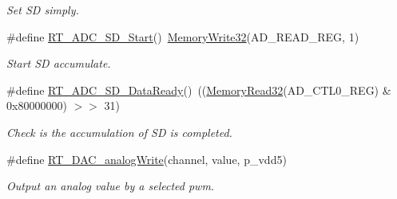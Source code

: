 \begin{DoxyCompactItemize}
\begin{DoxyCompactList}\small\item\em Set SD simply. \end{DoxyCompactList}\item 
\#define \mbox{\hyperlink{a00002_a201094f8f020811fe7d1cb26efe47094}{R\+T\+\_\+\+A\+D\+C\+\_\+\+S\+D\+\_\+\+Start}}()~\mbox{\hyperlink{a00020_a6b9732365b12e48ddb89fe1028b975b0}{Memory\+Write32}}(A\+D\+\_\+\+R\+E\+A\+D\+\_\+\+R\+EG, 1)
\begin{DoxyCompactList}\small\item\em Start SD accumulate. \end{DoxyCompactList}\item 
\#define \mbox{\hyperlink{a00002_aa3fc5e0f9802d24cd8c0090c86bf9299}{R\+T\+\_\+\+A\+D\+C\+\_\+\+S\+D\+\_\+\+Data\+Ready}}()~((\mbox{\hyperlink{a00020_a2d484dc15bdf30ee11ab3b05f31f0e16}{Memory\+Read32}}(A\+D\+\_\+\+C\+T\+L0\+\_\+\+R\+EG) \& 0x80000000) $>$$>$ 31)
\begin{DoxyCompactList}\small\item\em Check is the accumulation of SD is completed. \end{DoxyCompactList}\item 
\#define \mbox{\hyperlink{a00002_ab44c37130776b81ef554d8967fcf9e62}{R\+T\+\_\+\+D\+A\+C\+\_\+analog\+Write}}(channel,  value,  p\+\_\+vdd5)
\begin{DoxyCompactList}\small\item\em Output an analog value by a selected pwm. \end{DoxyCompactList}\end{DoxyCompactItemize}
